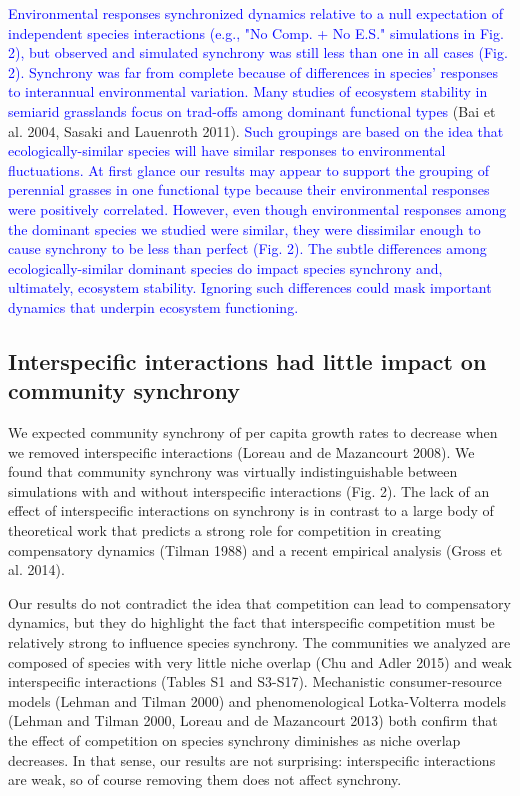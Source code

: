 \documentclass[11pt,]{article}
\begin{document}
\textcolor{blue}{Environmental responses synchronized dynamics relative to a null expectation of independent species interactions (e.g., "No Comp. + No E.S." simulations in Fig. 2), but observed and simulated synchrony was still less than one in all cases (Fig. 2).
Synchrony was far from complete because of differences in species' responses to interannual environmental variation.
Many studies of ecosystem stability in semiarid grasslands focus on trad-offs among dominant functional types}
(Bai et al. 2004, Sasaki and Lauenroth 2011).
\textcolor{blue}{Such groupings are based on the idea that ecologically-similar species will have similar responses to environmental fluctuations.
At first glance our results may appear to support the grouping of perennial grasses in one functional type because their environmental responses were positively correlated.
However, even though environmental responses among the dominant species we studied were similar, they were dissimilar enough to cause synchrony to be less than perfect (Fig. 2).
The subtle differences among ecologically-similar dominant species do impact species synchrony and, ultimately, ecosystem stability.
Ignoring such differences could mask important dynamics that underpin ecosystem functioning.}

\subsection{Interspecific interactions had little impact on community synchrony}

We expected community synchrony of per capita growth rates to decrease
when we removed interspecific interactions (Loreau and {{de Mazancourt}}
2008). We found that community synchrony was virtually indistinguishable
between simulations with and without interspecific interactions (Fig.
2). The lack of an effect of interspecific interactions on synchrony is
in contrast to a large body of theoretical work that predicts a strong
role for competition in creating compensatory dynamics (Tilman 1988) and
a recent empirical analysis (Gross et al. 2014).

Our results do not contradict the idea that competition can lead to
compensatory dynamics, but they do highlight the fact that interspecific
competition must be relatively strong to influence species synchrony.
The communities we analyzed are composed of species with very little
niche overlap (Chu and Adler 2015) and weak interspecific interactions
(Tables S1 and S3-S17). Mechanistic consumer-resource models (Lehman and
Tilman 2000) and phenomenological Lotka-Volterra models (Lehman and
Tilman 2000, Loreau and {{de Mazancourt}} 2013) both confirm that the
effect of competition on species synchrony diminishes as niche overlap
decreases. In that sense, our results are not surprising: interspecific
interactions are weak, so of course removing them does not affect
synchrony.
\end{document}
